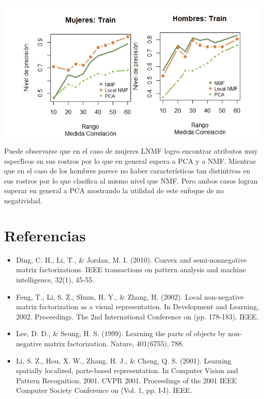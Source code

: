 \documentclass[a0,portrait]{a0poster}
\begin{document}
\begin{multicols}{3}
\begin{center}
\includegraphics[width=1.0\linewidth]{resultados2}
\end{center}%

\color{SaddleBrown} 
Puede observarse que en el caso de mujeres LNMF logro encontrar atributos muy espec\'ficos en sus rostros por lo que en general supera a PCA y a NMF. Mientras que en el caso de los hombres parece no haber caracter\'isticas tan distintivas en sus rostros por lo que clasifica al mismo nivel que NMF. Pero ambos casos logran superar en general a PCA mostrando la utilidad de este enfoque de no negatividad.

\color{Black} 
\section*{Referencias}
\begin{itemize}
\item Ding, C. H., Li, T., \& Jordan, M. I. (2010). Convex and semi-nonnegative matrix factorizations. IEEE transactions on pattern analysis and machine intelligence, 32(1), 45-55.
\item Feng, T., Li, S. Z., Shum, H. Y., \& Zhang, H. (2002). Local non-negative matrix factorization as a visual representation. In Development and Learning, 2002. Proceedings. The 2nd International Conference on (pp. 178-183). IEEE.
\item Lee, D. D., \& Seung, H. S. (1999). Learning the parts of objects by non-negative matrix factorization. Nature, 401(6755), 788. 
\item Li, S. Z., Hou, X. W., Zhang, H. J., \& Cheng, Q. S. (2001). Learning spatially localized, parts-based representation. In Computer Vision and Pattern Recognition, 2001. CVPR 2001. Proceedings of the 2001 IEEE Computer Society Conference on (Vol. 1, pp. I-I). IEEE.


\end{itemize}
\end{multicols}
\end{document}
